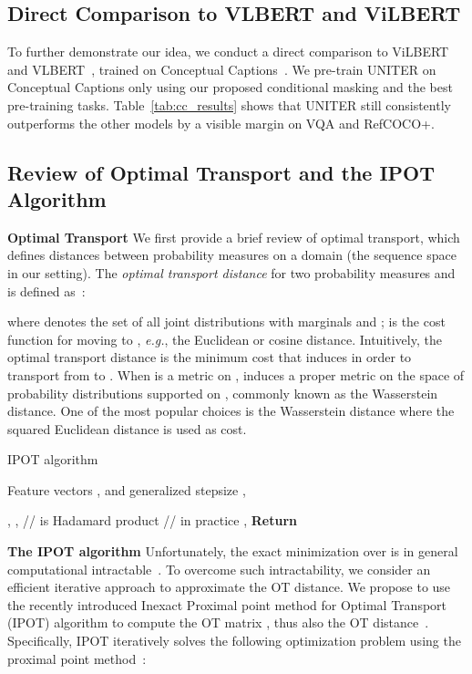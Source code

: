 \documentclass[runningheads]{llncs}
\begin{document}
\subsection{Direct Comparison to VLBERT and ViLBERT} \label{sec:comparison_vlbert}
To further demonstrate our idea, we conduct a direct comparison to ViLBERT~\cite{lu2019vilbert} and VLBERT~\cite{su2019vl}, trained on Conceptual Captions~\cite{sharma2018conceptual}.
We pre-train UNITER on Conceptual Captions only using our proposed conditional masking and the best pre-training tasks.
Table~\ref{tab:cc_results} shows that UNITER still consistently outperforms the other models by a visible margin on VQA and RefCOCO+.

\subsection{Review of Optimal Transport and the IPOT Algorithm} \label{sec:ot_ipot}

\noindent \textbf{Optimal Transport}
We first provide a brief review of optimal transport, which defines distances between probability measures on a domain  (the sequence space in our setting). 
The \textit{optimal transport distance} for two probability measures  and  is defined as~\cite{peyre2019computational}:
 
where  denotes the set of all joint distributions  with marginals  and ;  is the cost function for moving  to , \emph{e.g.}, the Euclidean or cosine distance. Intuitively, the optimal transport distance is the minimum cost that  induces in order to transport from  to . When  is a metric on ,  induces a proper metric on the space of probability distributions supported on , commonly known as the Wasserstein distance. One of the most popular choices is the Wasserstein distance  where the squared Euclidean distance  is used as cost. 


\begin{algorithm}[t!]
\small
\caption{\small{IPOT algorithm}}
\label{alg:ipot}
\begin{algorithmic}[1]
 Feature vectors 
 ,   and generalized stepsize , 

\State , 
\State , 
\For{}
    \State  \footnotesize{//  is Hadamard product}
    \For{} \footnotesize{//  in practice}
        \State , 
    \EndFor
    \State 
\EndFor
\State \textbf{Return} 
\end{algorithmic}
\end{algorithm}
 
\vspace{5pt}
\noindent \textbf{The IPOT algorithm}
Unfortunately, the exact minimization over  is in general computational intractable~\cite{wgan,genevay2018learning,salimans2018improving}. To overcome such intractability, we consider an efficient iterative approach to approximate the OT distance. 
We propose to use the recently introduced Inexact Proximal point method for Optimal Transport (IPOT) algorithm to compute the OT matrix , thus also the OT distance~\cite{xie2018fast}. 
Specifically, IPOT iteratively solves the following optimization problem using the proximal point method~\cite{boyd2004convex}:
\end{document}
